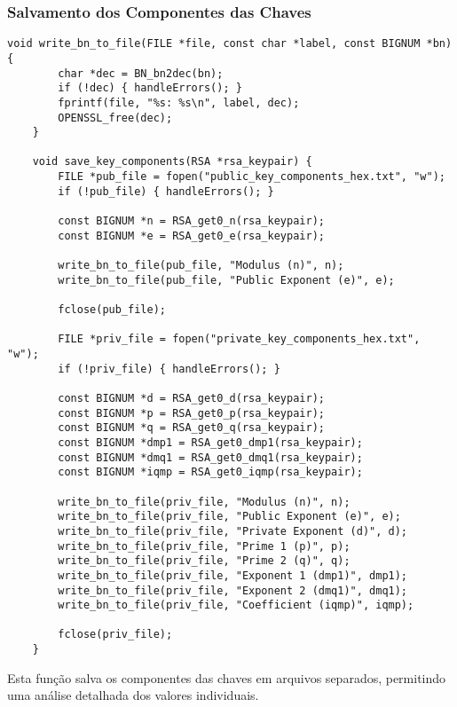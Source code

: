 \documentclass[a4paper,12pt]{article}
\begin{document}
\subsubsection*{Salvamento dos Componentes das Chaves}
\begin{lstlisting}[style=CStyle]
    void write_bn_to_file(FILE *file, const char *label, const BIGNUM *bn) {
        char *dec = BN_bn2dec(bn);
        if (!dec) { handleErrors(); }
        fprintf(file, "%s: %s\n", label, dec);
        OPENSSL_free(dec);
    }
    
    void save_key_components(RSA *rsa_keypair) {
        FILE *pub_file = fopen("public_key_components_hex.txt", "w");
        if (!pub_file) { handleErrors(); }
    
        const BIGNUM *n = RSA_get0_n(rsa_keypair);
        const BIGNUM *e = RSA_get0_e(rsa_keypair);
    
        write_bn_to_file(pub_file, "Modulus (n)", n);
        write_bn_to_file(pub_file, "Public Exponent (e)", e);
    
        fclose(pub_file);
    
        FILE *priv_file = fopen("private_key_components_hex.txt", "w");
        if (!priv_file) { handleErrors(); }
    
        const BIGNUM *d = RSA_get0_d(rsa_keypair);
        const BIGNUM *p = RSA_get0_p(rsa_keypair);
        const BIGNUM *q = RSA_get0_q(rsa_keypair);
        const BIGNUM *dmp1 = RSA_get0_dmp1(rsa_keypair);
        const BIGNUM *dmq1 = RSA_get0_dmq1(rsa_keypair);
        const BIGNUM *iqmp = RSA_get0_iqmp(rsa_keypair);
    
        write_bn_to_file(priv_file, "Modulus (n)", n);
        write_bn_to_file(priv_file, "Public Exponent (e)", e);
        write_bn_to_file(priv_file, "Private Exponent (d)", d);
        write_bn_to_file(priv_file, "Prime 1 (p)", p);
        write_bn_to_file(priv_file, "Prime 2 (q)", q);
        write_bn_to_file(priv_file, "Exponent 1 (dmp1)", dmp1);
        write_bn_to_file(priv_file, "Exponent 2 (dmq1)", dmq1);
        write_bn_to_file(priv_file, "Coefficient (iqmp)", iqmp);
    
        fclose(priv_file);
    }
\end{lstlisting}
Esta função salva os componentes das chaves em arquivos separados, permitindo uma análise detalhada dos valores individuais.
\end{document}
